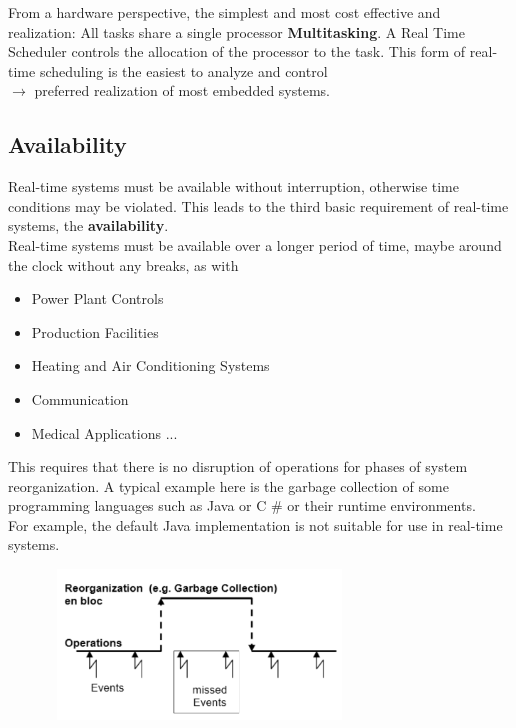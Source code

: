 From a hardware perspective, the simplest and most cost effective and realization: All tasks share a single processor \textbf{Multitasking}. A Real Time Scheduler controls the allocation of the processor to the task. This form of real-time scheduling is the easiest to analyze and control \\ 

$\rightarrow$ preferred realization of most embedded systems.

\subsection{Availability}

Real-time systems must be available without interruption, otherwise time conditions may be violated. This leads to the third basic requirement of real-time systems, the \textbf{availability}. \\

Real-time systems must be available over a longer period of time, maybe around the clock without any breaks, as with

\begin{itemize}
	\item  Power Plant Controls
	\item  Production Facilities
	\item  Heating and Air Conditioning Systems
	\item  Communication
	\item  Medical Applications ...
\end{itemize}

This requires that there is no disruption of operations for phases of system reorganization. A typical example here is the garbage collection of some programming languages such as Java or C \# or their runtime environments. \\

For example, the default Java implementation is not suitable for use in real-time systems. 

	\begin{figure}[h]
    \centering
    \includegraphics[width=8cm, height=4cm]{Images/image71.png}
    \label{fig:Fig 17}
    \end{figure}

